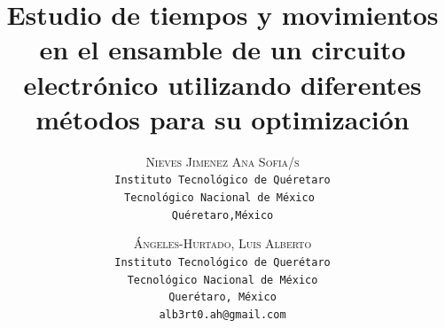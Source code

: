 \lfoot{ \thepage}

\setlength{\droptitle}{-5\baselineskip} %
\title{\textbf{Estudio de tiempos y movimientos en el ensamble de un circuito electrónico utilizando diferentes métodos para su optimización }} %

 \author{ 
 \textsc{Nieves Jimenez Ana Sofia/s}\\ 
 \texttt{ Instituto Tecnológico de Quéretaro } \\ 
 \texttt{Tecnológico Nacional de México } \\ 
 \texttt{Quéretaro,México}\\ 
 \texttt{} 
 \and 
 \textsc{Ángeles-Hurtado, Luis Alberto}\\ 
 \texttt{ Instituto Tecnológico de Querétaro } \\ 
 \texttt{ Tecnológico Nacional de México } \\ 
 \texttt{Querétaro, México}\\ 
 \texttt{alb3rt0.ah@gmail.com} 
}



% 

\maketitle
\thispagestyle{fancy}

